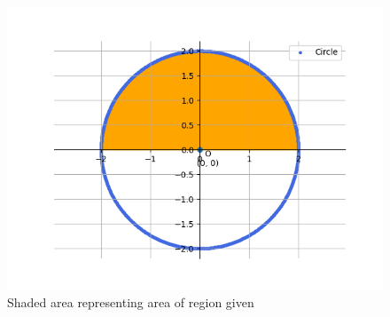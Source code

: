 \documentclass[journal]{IEEEtran}
\begin{document}
\begin{figure}[h!]
   \centering
   \includegraphics[width=0.7\linewidth]{figs/graph.png}
   \caption{Shaded area representing area of region given}
\end{figure}
\end{document}
